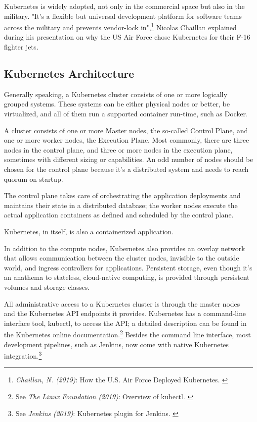 Kubernetes is widely adopted, not only in the commercial space but also in the military. "It’s a flexible but universal development platform for software teams across the military and prevents vendor-lock in",\footnote{\textit{Chaillan, N. (2019)}: How the U.S. Air Force Deployed Kubernetes. \cite{airForce}} Nicolas Chaillan explained during his presentation on why the US Air Force chose Kubernetes for their F-16 fighter jets.

\subsection{Kubernetes Architecture}

Generally speaking, a Kubernetes cluster consists of one or more logically grouped systems. These systems can be either physical nodes or better, be virtualized, and all of them run a supported container run-time, such as Docker.

A cluster consists of one or more Master nodes, the so-called Control Plane, and one or more worker nodes, the Execution Plane. Most commonly, there are three nodes in the control plane, and three or more nodes in the execution plane, sometimes with different sizing or capabilities. An odd number of nodes should be chosen for the control plane because it's a distributed system and needs to reach quorum on startup.

The control plane takes care of orchestrating the application deployments and maintains their state in a distributed database; the worker nodes execute the actual application containers as defined and scheduled by the control plane.

Kubernetes, in itself, is also a containerized application.

In addition to the compute nodes, Kubernetes also provides an overlay network that allows communication between the cluster nodes, invisible to the outside world, and ingress controllers for applications. Persistent storage, even though it's an anathema to stateless, cloud-native computing, is provided through persistent volumes and storage classes.

All administrative access to a Kubernetes cluster is through the master nodes and the Kubernetes API endpoints it provides. Kubernetes has a command-line interface tool, kubectl, to access the API; a detailed description can be found in the Kubernetes online documentation.\footnote{See \textit{The Linux Foundation (2019)}: Overview of kubectl. \cite{kubectl}} Besides the command line interface, most development pipelines, such as Jenkins, now come with native Kubernetes integration.\footnote{See \textit{Jenkins (2019)}: Kubernetes plugin for Jenkins. \cite{jenkinsK8s}}


